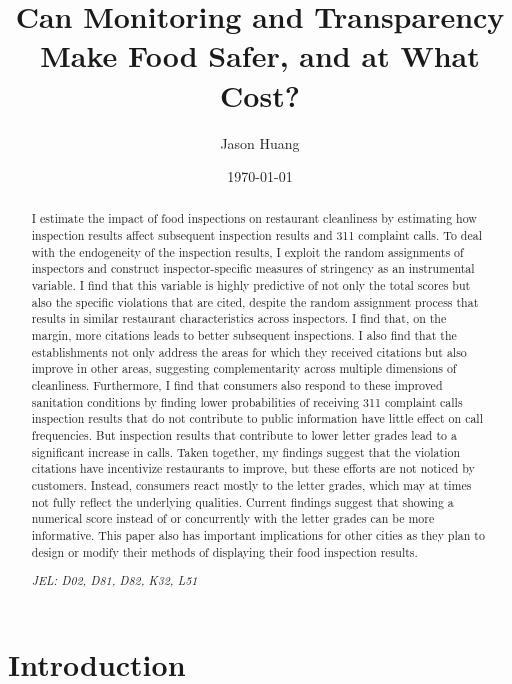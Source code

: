 \documentclass[11pt]{article}
\title{\textbf{Can Monitoring and Transparency Make Food Safer, and at What Cost?}}
\author{Jason Huang}
\date{\bigskip \today}
\begin{document}
\newcommand{\cfbox}[2]{%
    \colorlet{currentcolor}{.}%
    {\color{#1}%
    \fbox{\color{currentcolor}#2}}%
}

\maketitle

\begin{abstract}

I estimate the impact of food inspections on restaurant cleanliness by estimating how inspection results affect subsequent inspection results and 311 complaint calls. To deal with the endogeneity of the inspection results, I exploit the random assignments of inspectors and construct inspector-specific measures of stringency as an instrumental variable. I find that this variable is highly predictive of not only the total scores but also the specific violations that are cited, despite the random assignment process that results in similar restaurant characteristics across inspectors. I find that, on the margin, more citations leads to better subsequent inspections. I also find that the establishments not only address the areas for which they received citations but also improve in other areas, suggesting complementarity across multiple dimensions of cleanliness. Furthermore, I find that consumers also respond to these improved sanitation conditions by finding lower probabilities of receiving 311 complaint calls inspection results that do not contribute to public information have little effect on call frequencies. But inspection results that contribute to lower letter grades lead to a significant increase in calls. Taken together, my findings suggest that the violation citations have incentivize restaurants to improve, but these efforts are not noticed by customers. Instead, consumers react mostly to the letter grades, which may at times not fully reflect the underlying qualities. Current findings suggest that showing a numerical score instead of or concurrently with the letter grades can be more informative. This paper also has important implications for other cities as they plan to design or modify their methods of displaying their food inspection results.

\textit{JEL: D02, D81, D82, K32, L51}\\
\end{abstract}
\thispagestyle{empty} \newpage

\onehalfspacing \setcounter{page}{1}

\section{Introduction}
\end{document}
